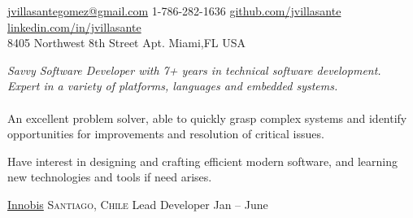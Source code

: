 \documentclass[10pt,a4paper]{article}
\begin{document}
\sloppy  %



\nobreakvspace{0.3em}  %

\noindent\href{mailto:jvillasantegomez.at.gmail.dot.com}{jvillasantegomez\mbox{}@\mbox{}gmail.com}\sbull
\textsmaller{+}1-786-282-1636\sbull
\href{https://github.com/jvillasante}{github.com/jvillasante}\sbull
\href{http://linkedin.com/in/jvillasante}{linkedin.com/in/jvillasante}
\\
8405 Northwest 8{\large \sc th} Street {\large \sc Apt.}\sbull
Miami,\thinspace FL\sbull
{\large {}}\sbull
USA

\spacedhrule{0.9em}{-0.4em}  %


\vspace{-1.3em}  %
\begin{multicols}{2}  %
\noindent \emph{Savvy Software Developer with 7+ years in technical software development. Expert in a variety of platforms, languages and embedded systems.}
\\
\\
An excellent problem solver, able to quickly grasp complex systems and identify opportunities for improvements and resolution of critical issues.

Have interest in designing and crafting efficient modern software, and learning new technologies and tools if need arises.
\end{multicols}


\spacedhrule{0em}{-0.4em}


\headedsection
  {\href{http://innobis.cl}{Innobis}}
  {\textsc{Santiago, Chile}} {%
  \headedsubsection
    {Lead Developer}
    {Jan  -- June }
    {}
}
\end{document}
